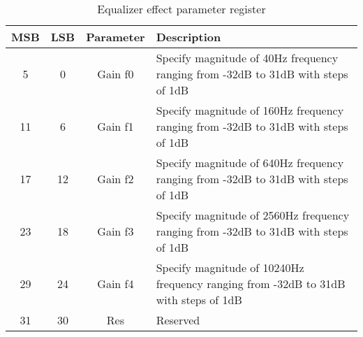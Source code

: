 \begin{table}[h!]
    \centering
    \begin{tabular}{|c|c|c|p{3.5in}|}
        \hline
        MSB & LSB & Parameter & Description\\
        \hline
        5 & 0 & Gain f0 & Specify magnitude of 40Hz frequency ranging from -32dB to 31dB with steps of 1dB\\
        \hline
        11 & 6 & Gain f1 & Specify magnitude of 160Hz frequency ranging from -32dB to 31dB with steps of 1dB\\
        \hline
        17 & 12 & Gain f2 & Specify magnitude of 640Hz frequency ranging from -32dB to 31dB with steps of 1dB\\
        \hline
        23 & 18 & Gain f3 & Specify magnitude of 2560Hz frequency ranging from -32dB to 31dB with steps of 1dB\\
        \hline
        29 & 24 & Gain f4 & Specify magnitude of 10240Hz frequency ranging from -32dB to 31dB with steps of 1dB\\
        \hline
        31 & 30 & Res & Reserved\\
        \hline
    \end{tabular}
    \caption{Equalizer effect parameter register}
    \label{table:eq-effect-parameters}
\end{table}




